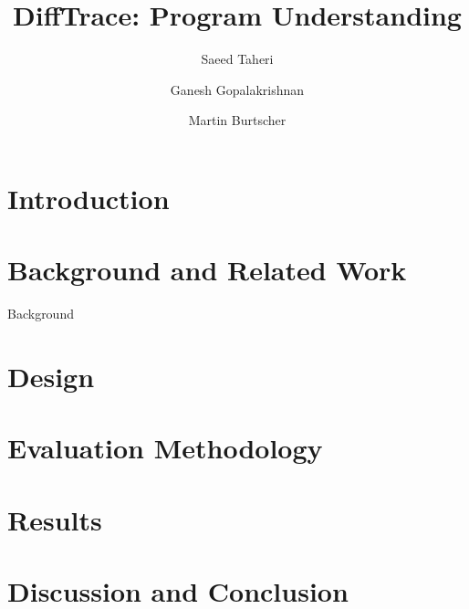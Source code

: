 \documentclass[sigconf]{acmart}
\begin{document}
\title{ DiffTrace: Program Understanding}


\author{Saeed Taheri}

\author{Ganesh Gopalakrishnan}

\author{Martin Burtscher}




\begin{abstract}
\label{abs}

\end{abstract}


\maketitle


\section{Introduction}
\label{sec:intro}
%


\section{Background and Related Work}
\label{sec:bgreltool}
Background


\section{Design }
\label{sec:design}
%

\section{Evaluation Methodology}
\label{sec:evalmeth}
%

\section{Results}
\label{sec:results}


    

\section{Discussion and Conclusion}
\label{sec:concl}
%




\end{document}
